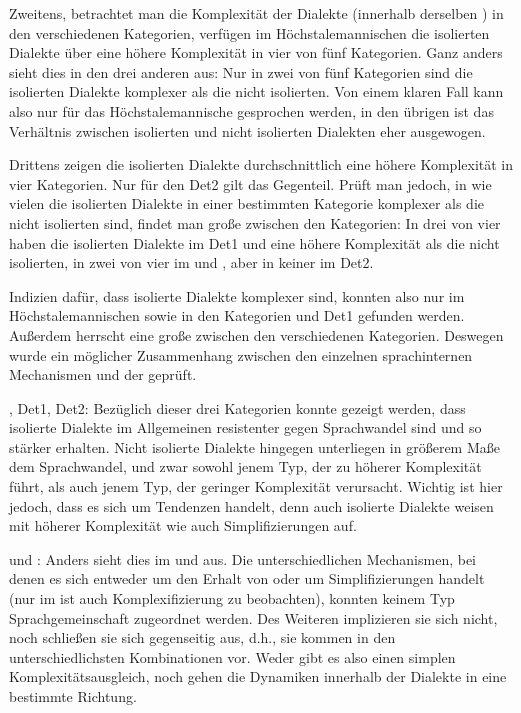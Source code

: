 Zweitens, betrachtet man die Komplexität der Dialekte (innerhalb derselben ) in den verschiedenen Kategorien, verfügen im Höchstalemannischen die isolierten Dialekte über eine höhere Komplexität in vier von fünf Kategorien. Ganz anders sieht dies in den drei anderen  aus: Nur in zwei von fünf Kategorien sind die isolierten Dialekte komplexer als die nicht isolierten. Von einem klaren Fall kann also nur für das Höchstalemannische gesprochen werden, in den übrigen  ist das Verhältnis zwischen isolierten und nicht isolierten Dialekten eher ausgewogen.

Drittens zeigen die isolierten Dialekte durchschnittlich eine höhere Komplexität in vier Kategorien. Nur für den Det2 gilt das Gegenteil. Prüft man jedoch, in wie vielen  die isolierten Dialekte in einer bestimmten Kategorie komplexer als die nicht isolierten sind, findet man große  zwischen den Kategorien: In drei von vier  haben die isolierten Dialekte im Det1 und  eine höhere Komplexität als die nicht isolierten, in zwei von vier  im  und , aber in keiner  im Det2.

Indizien dafür, dass isolierte Dialekte komplexer sind, konnten also nur im Höchstalemannischen sowie in den Kategorien  und Det1 gefunden werden. Außerdem herrscht eine große  zwischen den verschiedenen Kategorien. Deswegen wurde ein möglicher Zusammenhang zwischen den einzelnen sprachinternen Mechanismen und der  geprüft.

{, Det1, Det2:} Bezüglich dieser drei Kategorien konnte gezeigt werden, dass isolierte Dialekte im Allgemeinen resistenter gegen Sprachwandel sind und so stärker  erhalten. Nicht isolierte Dialekte hingegen unterliegen in größerem Maße dem Sprachwandel, und zwar sowohl jenem Typ, der zu höherer Komplexität führt, als auch jenem Typ, der geringer Komplexität verursacht. Wichtig ist hier jedoch, dass es sich um Tendenzen handelt, denn auch isolierte Dialekte weisen  mit höherer Komplexität wie auch Simplifizierungen auf.

{ und :} Anders sieht dies im  und  aus. Die unterschiedlichen Mechanismen, bei denen es sich entweder um den Erhalt von  oder um Simplifizierungen handelt (nur im  ist auch Komplexifizierung zu beobachten), konnten keinem Typ Sprachgemeinschaft zugeordnet werden. Des Weiteren implizieren sie sich nicht, noch schließen sie sich gegenseitig aus, d.h., sie kommen in den unterschiedlichsten Kombinationen vor. Weder gibt es also einen simplen Komplexitätsausgleich, noch gehen die Dynamiken innerhalb der Dialekte in eine bestimmte Richtung.


